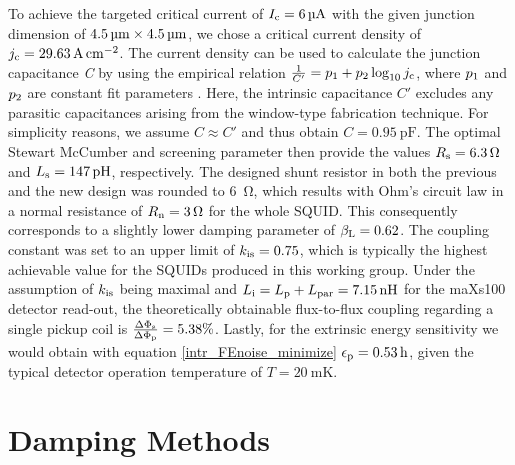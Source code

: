 
To achieve the targeted critical current of $I_{\rm c}=\qty{6}{\micro\ampere}$ with the given junction dimension of $\qtyproduct{4.5 x 4.5}{\micro\meter}$, we chose a critical current density of $j_{\rm c}=\qty{29.63}{\ampere\per\cm\squared}$. The current density can be used to calculate the junction capacitance \textit{C} by using the empirical relation $\frac{1}{C'}=p_1 + p_2\log_{10}j_{\rm c}$, where $p_{\rm 1}$ and $p_{\rm 2}$ are constant fit parameters \cite{Maezawa1995}. Here, the intrinsic capacitance $C'$ excludes any parasitic capacitances arising from the window-type fabrication technique. For simplicity reasons, we assume $C\approx C'$ and thus obtain $C=\qty{0.95}{\pico\farad}$. The optimal Stewart McCumber and screening parameter then provide the values $R_{\rm s}=\qty{6.3}{\ohm}$ and $L_{\rm s}=\qty{147}{\pico\henry}$, respectively. The designed shunt resistor in both the previous and the new design was rounded to \qty{6}{\ohm}, which results with Ohm's circuit law in a normal resistance of $R_{\rm n}=\qty{3}{\ohm}$ for the whole SQUID. This consequently corresponds to a slightly lower damping parameter of $\beta_{\rm L}=0.62$. The coupling constant was set to an upper limit of $k_{\rm is}=0.75$, which is typically the highest achievable value for the SQUIDs produced in this working group. Under the assumption of $k_{\rm is}$ being maximal and $L_{\rm i}=L_{\rm p}+L_{\rm par}=\qty{7.15}{\nano\henry}$ for the maXs100 detector read-out, the theoretically obtainable flux-to-flux coupling regarding a single pickup coil is $\frac{\Delta\Phi_{\rm s}}{\Delta\Phi_{\rm p}}=5.38\%$. Lastly, for the extrinsic energy sensitivity we would obtain with equation \ref{intr_FEnoise_minimize} $\epsilon_{\rm p}=\qty{0.53}{h}$, given the typical detector operation temperature of $T=\qty{20}{\milli\kelvin}$.   

\section{Damping Methods} \label{sec_damping}

